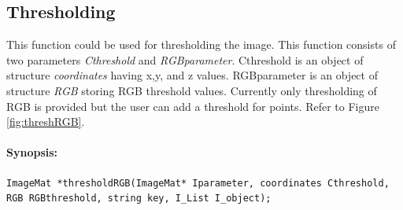 \subsection{Thresholding}
This function could be used for thresholding the image. This function consists of two parameters \textit{Cthreshold} and \textit{RGBparameter}. Cthreshold is an object of structure \textit{coordinates} having x,y, and z values. RGBparameter is an object of structure \textit{RGB} storing RGB threshold values. Currently only thresholding of RGB is provided but the user can add a threshold for points. Refer to Figure \ref{fig:threshRGB}.
\paragraph{Synopsis:}
\begin{lstlisting}
ImageMat *thresholdRGB(ImageMat* Iparameter, coordinates Cthreshold, RGB RGBthreshold, string key, I_List I_object);
\end{lstlisting}
